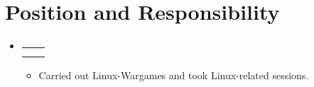 \documentclass[letterpaper,11pt]{article}
\makeatletter
\newcommand{\resumeItem}[1]{
  \item\small{
    {#1 \vspace{-2pt}}
  }
}
\newcommand{\resumeSubheading}[4]{
  \vspace{-2pt}\item
    \begin{tabular*}{1.0\textwidth}[t]{l@{\extracolsep{\fill}}r}
      \textbf{#1} & \textbf{\small #2} \\
      \textit{\small#3} & \textit{\small #4} \\
    \end{tabular*}\vspace{-7pt}
}
\newcommand{\resumeSubHeadingListStart}{\begin{itemize}[leftmargin=0.0in, label={}]}
\newcommand{\resumeSubHeadingListEnd}{\end{itemize}}
\newcommand{\resumeItemListStart}{\begin{itemize}}
\newcommand{\resumeItemListEnd}{\end{itemize}\vspace{-5pt}}
\makeatother
\begin{document}
\section{Position and Responsibility}
\vspace{-25pt}
    \resumeSubHeadingListStart
        \resumeSubheading{}{}{}{}
            \resumeItemListStart
                \resumeItem{Carried out Linux-Wargames and took Linux-related sessions.}
            \resumeItemListEnd
        
    \resumeSubHeadingListEnd
\end{document}
